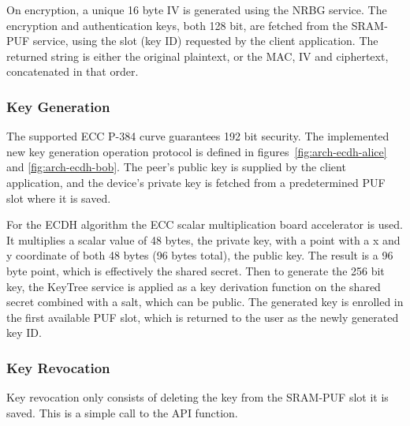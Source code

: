 On encryption, a unique 16 byte \ac{IV} is generated using the \ac{NRBG} service.
The encryption and authentication keys, both 128 bit, are fetched from the SRAM-PUF service, using the slot (key ID) requested by the client application.
The returned string is either the original plaintext, or the \ac{MAC}, \ac{IV} and ciphertext, concatenated in that order.




\subsubsection*{Key Generation}
The supported \ac{ECC} P-384 curve guarantees 192 bit security.
The implemented new key generation operation protocol is defined in figures~\ref{fig:arch-ecdh-alice} and \ref{fig:arch-ecdh-bob}.
The peer's public key is supplied by the client application, and the device's private key is fetched from a predetermined PUF slot where it is saved.

For the ECDH algorithm the ECC scalar multiplication board accelerator is used. It multiplies a scalar value of 48 bytes, the private key, with a point with a x and y coordinate of both 48 bytes (96 bytes total), the public key.
The result is a 96 byte point, which is effectively the shared secret.
Then to generate the 256 bit key, the KeyTree service is applied as a key derivation function on the shared secret combined with a salt, which can be public.
The generated key is enrolled in the first available PUF slot, which is returned to the user as the newly generated key ID.

\subsubsection*{Key Revocation}
Key revocation only consists of deleting the key from the SRAM-PUF slot it is saved. This is a simple call to the API function.

